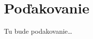 \thispagestyle{empty}
\section*{Poďakovanie}

Tu bude podakovanie\ldots

\newpage
\thispagestyle{empty}
\mbox{}
\newpage
\thispagestyle{empty}